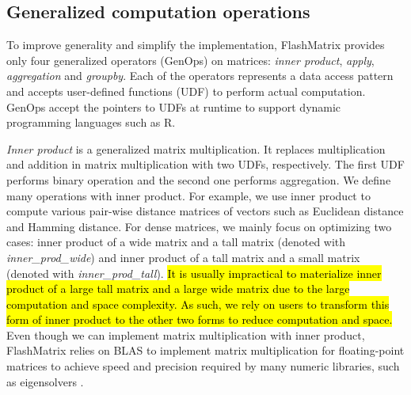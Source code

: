 


\subsection{Generalized computation operations} \label{sec:genop}
To improve generality and simplify the implementation, FlashMatrix provides
only four generalized operators (GenOps) on matrices: \textit{inner product},
\textit{apply}, \textit{aggregation} and \textit{groupby}. Each of the operators
represents a data access pattern and accepts user-defined functions (UDF) to
perform actual computation. GenOps accept the pointers to UDFs at runtime
to support dynamic programming languages such as R.

\textit{Inner product} is a generalized matrix multiplication. It replaces
multiplication and addition in matrix multiplication with two UDFs,
respectively. The first UDF performs binary operation and the second one
performs aggregation. We define many operations
with inner product. For example, we use inner product to compute various
pair-wise distance matrices of vectors such as Euclidean distance and
Hamming distance. For dense matrices, we mainly focus on
optimizing two cases: inner product of a wide matrix and a tall matrix (denoted
with \textit{inner\_prod\_wide}) and inner product of a tall matrix and a small
matrix (denoted with \textit{inner\_prod\_tall}). \hl{It is usually impractical to
materialize inner product of a large tall matrix and a large wide matrix due to
the large computation and space complexity. As such, we rely on users to
transform this form of inner product to the other two forms to reduce computation
and space.} Even though we can implement matrix multiplication with inner product,
FlashMatrix relies on BLAS to implement matrix multiplication for
floating-point matrices to achieve speed and precision required by
many numeric libraries, such as eigensolvers \cite{anasazi, FlashEigen}.

